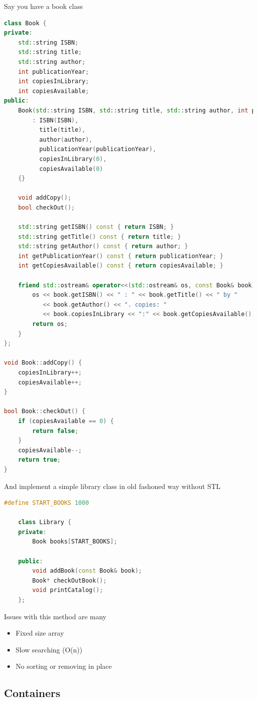 \documentclass{report}
\begin{document}
Say you have a book class

\begin{lstlisting}[language=C++]
class Book {
private:
	std::string ISBN;
	std::string title;
	std::string author;
	int publicationYear;
	int copiesInLibrary;
	int copiesAvailable;
public:
	Book(std::string ISBN, std::string title, std::string author, int publicationYear)
		: ISBN(ISBN),
		  title(title),
		  author(author),
		  publicationYear(publicationYear),
		  copiesInLibrary(0),
		  copiesAvailable(0)
	{}

	void addCopy();
	bool checkOut();

	std::string getISBN() const { return ISBN; }
	std::string getTitle() const { return title; }
	std::string getAuthor() const { return author; }
	int getPublicationYear() const { return publicationYear; }
	int getCopiesAvailable() const { return copiesAvailable; }

	friend std::ostream& operator<<(std::ostream& os, const Book& book) {
		os << book.getISBN() << " : " << book.getTitle() << " by " 
		   << book.getAuthor() << ". copies: " 
		   << book.copiesInLibrary << ":" << book.getCopiesAvailable();
		return os;
	}
};

void Book::addCopy() {
	copiesInLibrary++;
	copiesAvailable++;
}

bool Book::checkOut() {
	if (copiesAvailable == 0) {
		return false;
	}
	copiesAvailable--;
	return true;
}
\end{lstlisting}

And implement a simple library class in old fashoned way without STL

\begin{lstlisting}[language=C++]
	#define START_BOOKS 1000

	class Library {
	private:
		Book books[START_BOOKS];

	public:
		void addBook(const Book& book);
		Book* checkOutBook();
		void printCatalog();
	};
\end{lstlisting}

Issues with this method are many
\begin{itemize}
	\item Fixed size array
	\item Slow searching (O(n))
	\item No sorting or removing in place
\end{itemize}

\subsection{Containers}
\end{document}
